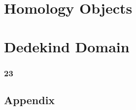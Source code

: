\part{Homology Objects}



\part{Dedekind Domain}
\section{23}


\begin{appendices}
\part{Appendix}
%

  

  

\end{appendices}

\newpage
\backmatter

\printglossaries

\newpage
{}
\printindex

\newpage
{}




